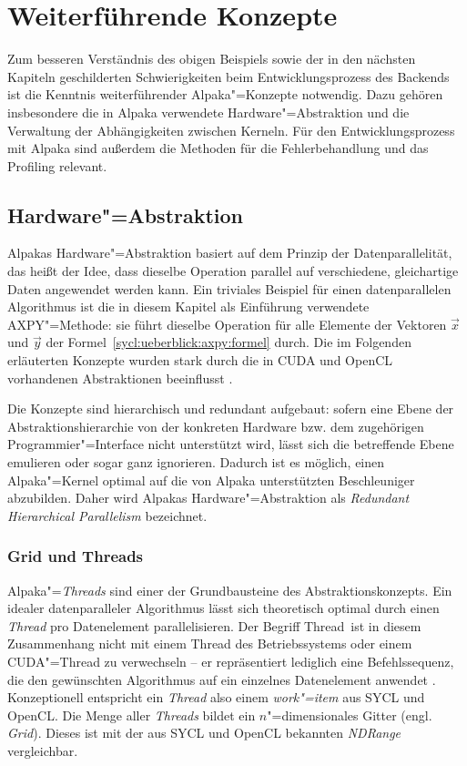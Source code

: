 \section{Weiterführende Konzepte}\label{alpaka:konzepte}

Zum besseren Verständnis des obigen Beispiels sowie der in den nächsten Kapiteln
geschilderten Schwierigkeiten beim Entwicklungsprozess des Backends ist die
Kenntnis weiterführender Alpaka"=Konzepte notwendig. Dazu gehören insbesondere
die in Alpaka verwendete Hardware"=Abstraktion und die Verwaltung der
Abhängigkeiten zwischen Kerneln. Für den Entwicklungsprozess mit Alpaka sind
außerdem die Methoden für die Fehlerbehandlung und das Profiling relevant.

\subsection{Hardware"=Abstraktion}
\label{alpaka:konzepte:abstraktion}

Alpakas Hardware"=Abstraktion basiert auf dem Prinzip der Datenparallelität, das
heißt der Idee, dass dieselbe Operation parallel auf verschiedene, gleichartige
Daten angewendet werden kann. Ein triviales Beispiel für einen datenparallelen
Algorithmus ist die in diesem Kapitel als Einführung verwendete AXPY"=Methode:
sie führt dieselbe Operation für alle Elemente der Vektoren $\vec{x}$ und
$\vec{y}$ der Formel~\ref{sycl:ueberblick:axpy:formel} durch. Die im Folgenden
erläuterten Konzepte wurden stark durch die in CUDA und OpenCL vorhandenen
Abstraktionen beeinflusst \cite[vgl.][17]{worpitz2015}.

Die Konzepte sind hierarchisch und redundant aufgebaut: sofern eine Ebene der
Abstraktionshierarchie von der konkreten Hardware bzw. dem zugehörigen
Programmier"=Interface nicht unterstützt wird, lässt sich die betreffende Ebene
emulieren oder sogar ganz ignorieren. Dadurch ist es möglich, einen
Alpaka"=Kernel optimal auf die von Alpaka unterstützten Beschleuniger
abzubilden. Daher wird Alpakas Hardware"=Abstraktion als \textit{Redundant
Hierarchical Parallelism} bezeichnet. \cite[vgl.][22]{worpitz2015}

\subsubsection{Grid und Threads}

Alpaka"=\textit{Threads} sind einer der Grundbausteine des Abstraktionskonzepts.
Ein idealer datenparalleler Algorithmus lässt sich theoretisch optimal durch
einen \textit{Thread} pro Datenelement parallelisieren. Der Begriff
\glqq Thread\grqq\ ist in diesem Zusammenhang nicht mit einem Thread des
Betriebssystems oder einem CUDA"=Thread zu verwechseln -- er repräsentiert
lediglich eine Befehlssequenz, die den gewünschten Algorithmus auf ein einzelnes
Datenelement anwendet \cite[vgl.][17]{worpitz2015}. Konzeptionell entspricht
ein \textit{Thread} also einem \textit{work"=item} aus SYCL und OpenCL. Die
Menge aller \textit{Threads} bildet ein $n$"=dimensionales Gitter
(engl. \textit{Grid}). Dieses ist mit der aus SYCL und OpenCL bekannten
\textit{NDRange} vergleichbar.

